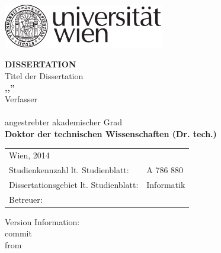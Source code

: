 
\makeatletter
\thispagestyle{empty}
\begin{titlepage}

\begin{flushright}
\includegraphics[width=7cm]{styles/logo-univie.pdf}
\end{flushright}

\begin{center}

\vskip 3cm

{\Large\bfseries DISSERTATION}\\[2.5cm]

{ Titel der Dissertation\\
\Large \bfseries ,,\@title''}\\[2cm]


{Verfasser\\
\bfseries \@author}\\[2cm]

{angestrebter akademischer Grad\\
\bfseries Doktor der technischen Wissenschaften (Dr. tech.)}\\[2cm]

\scalebox{1.1} {
\begin{tabular}{lp{8cm}}%
\small Wien, 2014 & ~\newline\newline\newline~ \\ %
\small Studienkennzahl lt. Studienblatt: & \small A 786 880 \\ %
\small Dissertationsgebiet lt. Studienblatt: & \small Informatik \\ %
\small Betreuer: & \small \\%
\end{tabular}}
\end{center}

\begin{center}
{\color{red}
Version Information: \\
commit \gitAbbrevHash \\
from \gitAuthorIsoDate 
}
\end{center}

\end{titlepage}
\makeatother